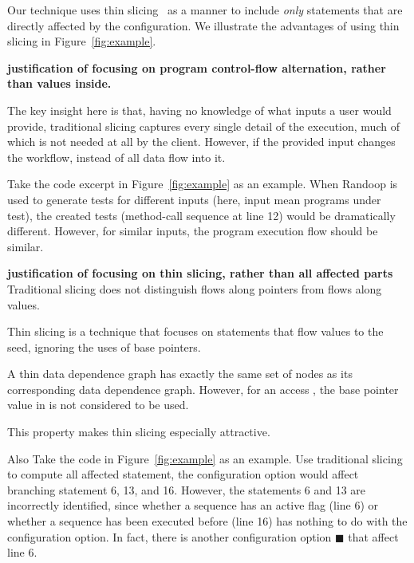 Our technique uses thin slicing~\cite{Sridharan:2007} as a manner to include
\textit{only} statements that are directly affected by the configuration.
We illustrate the advantages of using thin slicing 
 in Figure~\ref{fig:example}.





\textbf{justification of focusing on program control-flow
alternation, rather than values inside.}

The key insight here is that, having no knowledge of
what inputs a user would provide, traditional slicing
captures every single detail of the execution, much
of which is not needed at all by the client.
However, if the provided input changes the workflow,
instead of all data flow into it. 

Take the code excerpt in Figure~\ref{fig:example} as an example.
When Randoop is used to generate tests for different inputs (here,
input mean programs under test), the created tests (method-call
sequence at line 12) would be dramatically different.
However, for similar inputs, the program execution flow should
be similar.

\textbf{justification of focusing on thin slicing, rather
than all affected parts}
Traditional slicing does not distinguish flows along
pointers from flows along values.

Thin slicing is a technique that focuses on statements
that flow values to the seed, ignoring the uses of
base pointers.

A thin data dependence graph has exactly
the same set of nodes as its corresponding data dependence
graph. However, for an access , the base pointer value
in  is not considered to be used. 

This property makes thin slicing
especially attractive.

Also Take the code in Figure~\ref{fig:example} as an example.
Use traditional slicing to compute all affected statement,
the configuration option  would affect
branching statement 6, 13, and 16. However, the
statements 6 and 13 are incorrectly identified, since
whether a sequence has an active flag (line 6) or
whether a sequence has been executed before (line 16)
has nothing to do with the  configuration option.
In fact, there is another configuration option $\blacksquare$
that affect line 6.


